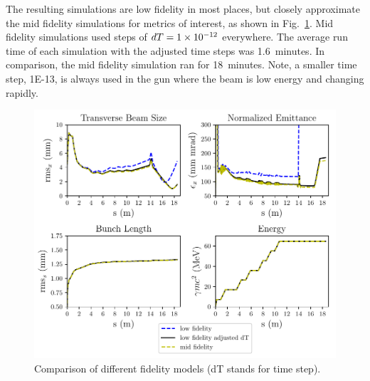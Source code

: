 The resulting simulations are low fidelity in most places, but closely approximate 
the mid fidelity simulations for metrics of interest, as shown in 
Fig.~\ref{tstep}.  Mid fidelity simulations used steps of  $dT=\num{1E-12}$ everywhere.
The average run time of each simulation with the adjusted time steps was 1.6~minutes.
In comparison, the mid fidelity simulation ran for 18~minutes.
Note, a smaller time step, \num{1E-13}, is always used in the gun where the 
beam is low energy and changing rapidly.

\begin{figure}%
	\centering
	\includegraphics[width=\linewidth]{Report/timestep_comparison_paper}
	\caption{Comparison of different fidelity models (dT stands for time step).}
	\label{tstep}
\end{figure}


